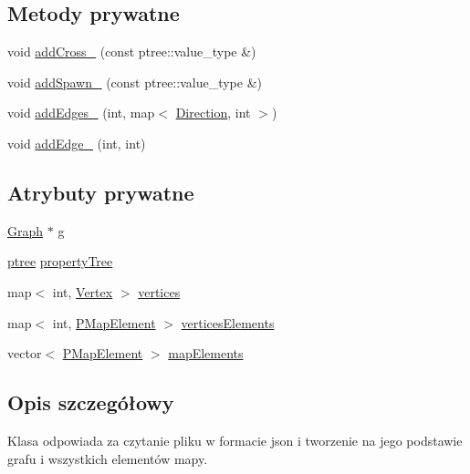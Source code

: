 \subsection*{Metody prywatne}
\begin{DoxyCompactItemize}
\item 
void \hyperlink{class_map_factory_a64ee27fb682c6cc7b4c45dd856b8e607}{add\-Cross\-\_\-} (const ptree\-::value\-\_\-type \&)
\item 
void \hyperlink{class_map_factory_a443185cbfeddc063df6aed004d2c21fd}{add\-Spawn\-\_\-} (const ptree\-::value\-\_\-type \&)
\item 
void \hyperlink{class_map_factory_ac4bdddf0aeeaedae80a2cd8814aefd78}{add\-Edges\-\_\-} (int, map$<$ \hyperlink{_direction_8h_a224b9163917ac32fc95a60d8c1eec3aa}{Direction}, int $>$)
\item 
void \hyperlink{class_map_factory_addec2c9f5a0056a0887f09b781ffecf0}{add\-Edge\-\_\-} (int, int)
\end{DoxyCompactItemize}
\subsection*{Atrybuty prywatne}
\begin{DoxyCompactItemize}
\item 
\hyperlink{_types_8h_adb8cbccb1bf63dda03515e30e185c388}{Graph} $\ast$ \hyperlink{class_map_factory_af4450d69783b74d07d8686da50c66621}{g}
\item 
\hyperlink{_map_factory_8h_a54a98738cc1e3485f2cf5f24979317e5}{ptree} \hyperlink{class_map_factory_af0cbd48b8917121329660bd28877fcc6}{property\-Tree}
\item 
map$<$ int, \hyperlink{_types_8h_a8c93f604acf57e6a9bae1f91c379ac98}{Vertex} $>$ \hyperlink{class_map_factory_ab3f7a784d24d1cf06f03429312d030b4}{vertices}
\item 
map$<$ int, \hyperlink{_types_8h_a4260a5280323637f8a1fa28e89b6ef14}{P\-Map\-Element} $>$ \hyperlink{class_map_factory_aaf7d7680404bc0ac40766ca305f75753}{vertices\-Elements}
\item 
vector$<$ \hyperlink{_types_8h_a4260a5280323637f8a1fa28e89b6ef14}{P\-Map\-Element} $>$ \hyperlink{class_map_factory_ad4677e42d2e82c5ca31fa931fa60f9ce}{map\-Elements}
\end{DoxyCompactItemize}


\subsection{Opis szczegółowy}
Klasa odpowiada za czytanie pliku w formacie json i tworzenie na jego podstawie grafu i wszystkich elementów mapy. 

